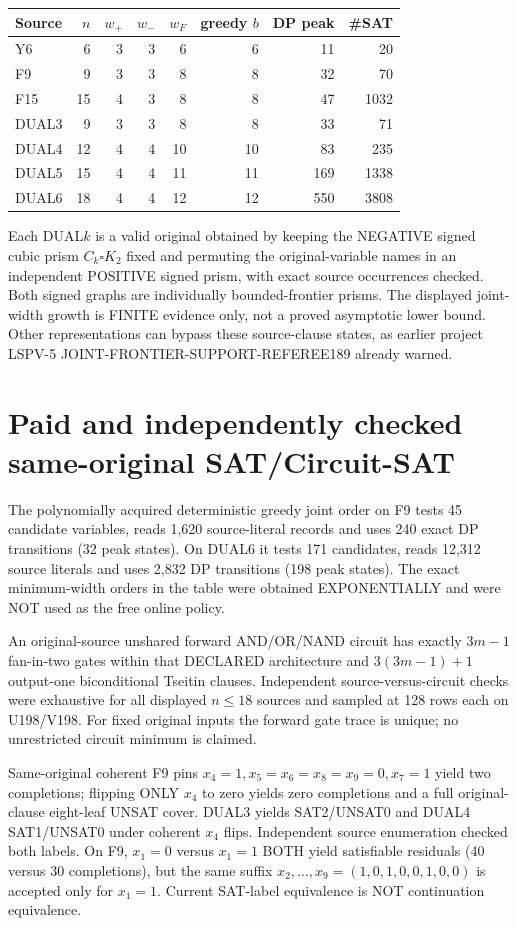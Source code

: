 \documentclass[11pt]{article}
\begin{document}
\begin{center}\begin{tabular}{lrrrrrrr}\toprule
Source & \(n\)&\(w_+\)&\(w_-\)&\(w_F\)&greedy \(b\)&DP peak&\#SAT\\\midrule
Y6&6&3&3&6&6&11&20\\
F9&9&3&3&8&8&32&70\\
F15&15&4&3&8&8&47&1032\\
DUAL3&9&3&3&8&8&33&71\\
DUAL4&12&4&4&10&10&83&235\\
DUAL5&15&4&4&11&11&169&1338\\
DUAL6&18&4&4&12&12&550&3808\\\bottomrule
\end{tabular}\end{center}
Each DUAL\(k\) is a valid original obtained by keeping the NEGATIVE signed cubic prism \(C_k\square K_2\) fixed and permuting the original-variable names in an independent POSITIVE signed prism, with exact source occurrences checked. Both signed graphs are individually bounded-frontier prisms. The displayed joint-width growth is FINITE evidence only, not a proved asymptotic lower bound. Other representations can bypass these source-clause states, as earlier project LSPV-5 JOINT-FRONTIER-SUPPORT-REFEREE189 already warned.

\section*{Paid and independently checked same-original SAT/Circuit-SAT}
The polynomially acquired deterministic greedy joint order on F9 tests 45 candidate variables, reads 1,620 source-literal records and uses 240 exact DP transitions (32 peak states). On DUAL6 it tests 171 candidates, reads 12,312 source literals and uses 2,832 DP transitions (198 peak states). The exact minimum-width orders in the table were obtained EXPONENTIALLY and were NOT used as the free online policy.

An original-source unshared forward AND/OR/NAND circuit has exactly \(3m-1\) fan-in-two gates within that DECLARED architecture and \(3(3m-1)+1\) output-one biconditional Tseitin clauses. Independent source-versus-circuit checks were exhaustive for all displayed \(n\le18\) sources and sampled at 128 rows each on U198/V198. For fixed original inputs the forward gate trace is unique; no unrestricted circuit minimum is claimed.

Same-original coherent F9 pins \(x_4=1,x_5=x_6=x_8=x_9=0,x_7=1\) yield two completions; flipping ONLY \(x_4\) to zero yields zero completions and a full original-clause eight-leaf UNSAT cover. DUAL3 yields SAT2/UNSAT0 and DUAL4 SAT1/UNSAT0 under coherent \(x_4\) flips. Independent source enumeration checked both labels. On F9, \(x_1=0\) versus \(x_1=1\) BOTH yield satisfiable residuals (40 versus 30 completions), but the same suffix \(x_2,\ldots,x_9=(1,0,1,0,0,1,0,0)\) is accepted only for \(x_1=1\). Current SAT-label equivalence is NOT continuation equivalence.
\end{document}
